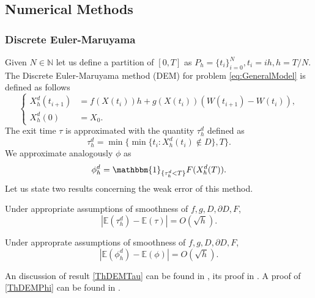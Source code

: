 \subsection{Numerical Methods}

\subsubsection{Discrete Euler-Maruyama}
Given $N \in \mathbb{N}$ let us define a partition of $[0,T]$ as $P_h = \{t_i\}_{i=0}^{N}, t_i = ih, h = T/N$. The Discrete Euler-Maruyama method (DEM) for problem \eqref{eq:GeneralModel} is defined as follows
\begin{equation}\label{eq:DEM}
	\left \{
	\begin{aligned}
		X_h^d(t_{i+1}) &= f(X(t_i))h + g(X(t_i))(W(t_{i+1}) - W(t_{i})),  \\
		X_h^d(0) &= X_0.
	\end{aligned} \right .
\end{equation} 
The exit time $\tau$ is approximated with the quantity $\tau_h^d$ defined as 
\begin{equation}\label{eq:TauDEM}
	\tau_h^d = \min\{\min \{t_i \colon X_h^d(t_i) \notin D\},T\}.
\end{equation}
We approximate analogously $\phi$ as
\begin{equation}\label{eq:PhiDEM}
	 \phi_h^d = \mathbbm{1}_{\{\tau_h^d < T\}}F(X_h^d(T)).
\end{equation}
Let us state two results concerning the weak error of this method.
\begin{theorem}\label{ThDEMTau} Under appropriate assumptions of smoothness of $f,g,D,\partial D,F$,
\begin{equation}\label{eq:ConvDEMTau}
	|\mathbb{E}(\tau_h^d) - \mathbb{E}(\tau)| = O(\sqrt{h}).
\end{equation}
\end{theorem}
\begin{theorem}\label{ThDEMPhi} Under approprate assumptions of smoothness of $f,g,D,\partial D,F$,
\begin{equation}\label{eq:ConvDEMPhi}
	|\mathbb{E}(\phi_h^d) - \mathbb{E}(\phi)| = O(\sqrt{h}).
\end{equation}	
\end{theorem}
An discussion of result \ref{ThDEMTau} can be found in \cite{Higham2013}, its proof in \cite{Gobet2010}. A proof of \ref{ThDEMPhi} can be found in \cite{Gobet2000}.

